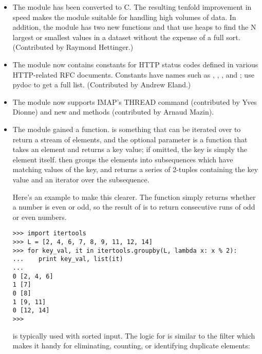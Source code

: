 \documentclass{howto}
\begin{document}
\begin{itemize}
\item The  module has been converted to C.  The resulting
   tenfold improvement in speed makes the module suitable for handling
   high volumes of data.  In addition, the module has two new functions
    and  that use heaps to
   find the N largest or smallest values in a dataset without the
   expense of a full sort.  (Contributed by Raymond Hettinger.)

\item The  module now contains constants for HTTP
status codes defined in various HTTP-related RFC documents.  Constants
have names such as , ,
, and ; use pydoc to
get a full list.  (Contributed by Andrew Eland.)

\item The  module now supports IMAP's THREAD command
(contributed by Yves Dionne) and new  and
 methods (contributed by Arnaud Mazin).

\item The  module gained a
   function.
   is something that can be iterated over to return a
  stream of elements, and the optional  parameter is a
  function that takes an element and returns a key value; if omitted,
  the key is simply the element itself.   then
  groups the elements into subsequences which have matching values of
  the key, and returns a series of 2-tuples containing the key value
  and an iterator over the subsequence.
 
Here's an example to make this clearer.  The  function simply
returns whether a number is even or odd, so the result of
 is to return consecutive runs of odd or even
numbers.

\begin{verbatim}
>>> import itertools
>>> L = [2, 4, 6, 7, 8, 9, 11, 12, 14]
>>> for key_val, it in itertools.groupby(L, lambda x: x % 2):
...    print key_val, list(it)
... 
0 [2, 4, 6]
1 [7]
0 [8]
1 [9, 11]
0 [12, 14]
>>> 
\end{verbatim}

 is typically used with sorted input.  The logic
for  is similar to the \UNIX{}  filter
which makes it handy for eliminating, counting, or identifying
duplicate elements:


\end{itemize}
\end{document}
